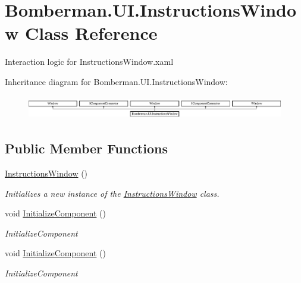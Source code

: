 \hypertarget{class_bomberman_1_1_u_i_1_1_instructions_window}{}\section{Bomberman.\+U\+I.\+Instructions\+Window Class Reference}
\label{class_bomberman_1_1_u_i_1_1_instructions_window}


Interaction logic for Instructions\+Window.\+xaml  


Inheritance diagram for Bomberman.\+U\+I.\+Instructions\+Window\+:\begin{figure}[H]
\begin{center}
\leavevmode
\includegraphics[height=1.051643cm]{class_bomberman_1_1_u_i_1_1_instructions_window}
\end{center}
\end{figure}
\subsection*{Public Member Functions}
\begin{DoxyCompactItemize}
\item 
\mbox{\hyperlink{class_bomberman_1_1_u_i_1_1_instructions_window_a5a53ea22baa08345e54cf6589f770381}{Instructions\+Window}} ()
\begin{DoxyCompactList}\small\item\em Initializes a new instance of the \mbox{\hyperlink{class_bomberman_1_1_u_i_1_1_instructions_window}{Instructions\+Window}} class. \end{DoxyCompactList}\item 
void \mbox{\hyperlink{class_bomberman_1_1_u_i_1_1_instructions_window_ad6e609958359984dc900ed1f68741efa}{Initialize\+Component}} ()
\begin{DoxyCompactList}\small\item\em Initialize\+Component \end{DoxyCompactList}\item 
void \mbox{\hyperlink{class_bomberman_1_1_u_i_1_1_instructions_window_ad6e609958359984dc900ed1f68741efa}{Initialize\+Component}} ()
\begin{DoxyCompactList}\small\item\em Initialize\+Component \end{DoxyCompactList}\end{DoxyCompactItemize}
